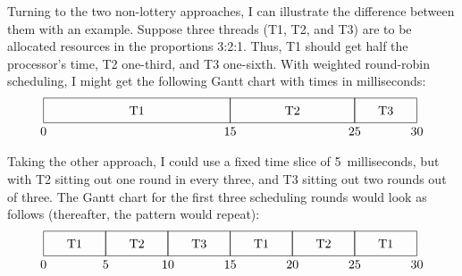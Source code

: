 Turning to the two non-lottery approaches, I can
illustrate the difference between them with an example.  Suppose
three threads (T1, T2, and T3) are to be allocated
resources in the proportions 3:2:1.  Thus, T1 should get half the
processor's time, T2 one-third, and T3 one-sixth.  With
weighted round-robin scheduling, I might
get the following Gantt chart with times in milliseconds:
\[\begin{tikzpicture}[scale=.035]
\draw (0,0) rectangle (150,20);
\draw (150,0) rectangle (250,20);
\draw (250,0) rectangle (300,20);
\draw (75,10) node{T1};
\draw (200,10) node{T2};
\draw (275,10) node{T3};
\draw (0,-7) node{0};
\draw (150,-7) node{15};
\draw (250,-7) node{25};
\draw (300,-7) node{30};
\end{tikzpicture}\]
\iffalse
\[\begin{graph}(310,32)(-3,-12)
\graphlinecolour{0}
\fillednodesfalse
\rectnode{a}[150,20](75,10)
\rectnode{b}[100,20](200,10)
\rectnode{c}[50,20](275,10)
\autonodetext{a}{T1}
\autonodetext{b}{T2}
\autonodetext{c}{T3}
\freetext(0,-7){0}
\freetext(150,-7){150}
\freetext(250,-7){250}
\freetext(300,-7){300}
\end{graph}\]
\fi
Taking the other approach, I could use a fixed time slice of
5~milliseconds, but with T2 sitting out one round in every three, and
T3 sitting out two rounds out of three.  The Gantt chart for the first
three scheduling rounds would look as follows (thereafter, the pattern
would repeat):
\[\begin{tikzpicture}[scale=.035]
\draw (0,0) rectangle (50,20);
\draw (50,0) rectangle (100,20);
\draw (100,0) rectangle (150,20);
\draw (150,0) rectangle (200,20);
\draw (200,0) rectangle (250,20);
\draw (250,0) rectangle (300,20);
\draw (25,10) node{T1};
\draw (75,10) node{T2};
\draw (125,10) node{T3};
\draw (175,10) node{T1};
\draw (225,10) node{T2};
\draw (275,10) node{T1};
\draw (0,-7) node{0};
\draw (50,-7) node{5};
\draw (100,-7) node{10};
\draw (150,-7) node{15};
\draw (200,-7) node{20};
\draw (250,-7) node{25};
\draw (300,-7) node{30};
\end{tikzpicture}\]
\iffalse
\[\begin{graph}(310,32)(-3,-12)
\graphlinecolour{0}
\fillednodesfalse
\rectnode{a}[50,20](25,10)
\rectnode{b}[50,20](75,10)
\rectnode{c}[50,20](125,10)
\rectnode{d}[50,20](175,10)
\rectnode{e}[50,20](225,10)
\rectnode{f}[50,20](275,10)
\autonodetext{a}{T1}
\autonodetext{b}{T2}
\autonodetext{c}{T3}
\autonodetext{d}{T1}
\autonodetext{e}{T2}
\autonodetext{f}{T1}
\freetext(0,-7){0}
\freetext(50,-7){50}
\freetext(100,-7){100}
\freetext(150,-7){150}
\freetext(200,-7){200}
\freetext(250,-7){250}
\freetext(300,-7){300}
\end{graph}\]
\fi

